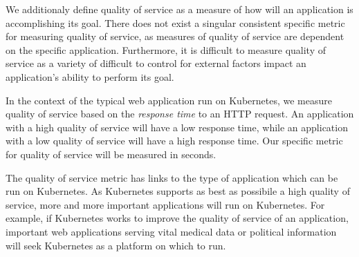 We additionaly define quality of service as a measure of how will an application
is accomplishing its goal. There does not exist a singular consistent specific
metric for measuring quality of service, as measures of quality of service are dependent on
the specific application. Furthermore, it is difficult to measure quality of
service as a variety of difficult to control for external factors impact an
application's ability to perform its goal.

In the context of the typical web application run on Kubernetes, we measure
quality of service based on the \textit{response time} to an HTTP request. An application
with a high quality of service will have a low response time, while an
application with a low quality of service will have a high response time. Our
specific metric for quality of service will be measured in seconds.

The quality of service metric has links to the type of application which can be
run on Kubernetes. As Kubernetes supports as best as possibile a high quality of
service, more and more important applications will run on Kubernetes. For
example, if Kubernetes works to improve the quality of service of an
application, important web applications serving vital medical data or political
information will seek Kubernetes as a platform on which to run.

